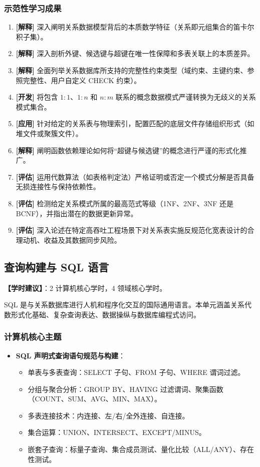 \subsubsection{示范性学习成果}
\begin{enumerate}
    \item \textbf{[解释]} 深入阐明关系数据模型背后的本质数学特征（关系即元组集合的笛卡尔积子集）。
    \item \textbf{[解释]} 深入剖析外键、候选键与超键在唯一性保障和多表关联上的本质差异。
    \item \textbf{[解释]} 全面列举关系数据库所支持的完整性约束类型（域约束、主键约束、参照完整性、用户自定义 CHECK 约束）。
    \item \textbf{[开发]} 将包含 $1:1$、$1:n$ 和 $n:m$ 联系的概念数据模式严谨转换为无歧义的关系模式集合。
    \item \textbf{[应用]} 针对给定的关系表与物理索引，配置匹配的底层文件存储组织形式（如堆文件或聚簇文件）。
    \item \textbf{[解释]} 阐明函数依赖理论如何将“超键与候选键”的概念进行严谨的形式化推广。
    \item \textbf{[评估]} 运用代数算法（如表格判定法）严格证明或否定一个模式分解是否具备无损连接性与保持依赖性。
    \item \textbf{[评估]} 检测给定关系模式所属的最高范式等级（1NF、2NF、3NF 还是 BCNF），并指出潜在的数据更新异常。
    \item \textbf{[评估]} 深入论述在特定高吞吐工程场景下对关系表实施反规范化宽表设计的合理动机、收益及其数据同步风险。
\end{enumerate}

\subsection{查询构建与 SQL 语言}
\textbf{【学时建议】}：2 计算机核心学时，4 领域核心学时。

SQL 是与关系数据库进行人机和程序化交互的国际通用语言。本单元涵盖关系代数形式化基础、复杂查询表达、数据操纵与数据库编程式访问。

\subsubsection{计算机核心主题}
\begin{itemize}
    \item \textbf{SQL 声明式查询语句规范与构建}：
    \begin{itemize}
        \item 单表与多表查询：SELECT 子句、FROM 子句、WHERE 谓词过滤。
        \item 分组与聚合分析：GROUP BY、HAVING 过滤谓词、聚集函数（COUNT、SUM、AVG、MIN、MAX）。
        \item 多表连接技术：内连接、左/右/全外连接、自连接。
        \item 集合运算：UNION、INTERSECT、EXCEPT/MINUS。
        \item 嵌套子查询：标量子查询、集合成员测试、量化比较（ALL/ANY）、存在性测试。
    \end{itemize}
\end{itemize}

